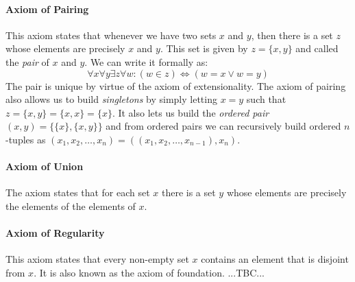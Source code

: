 
\paragraph{Axiom of Pairing}
This axiom states that whenever we have two sets $x$ and $y$, then there is a set $z$ whose elements are precisely $x$ and $y$. This set is given by $z = \{x, y\}$ and called the \emph{pair} of $x$ and $y$. We can write it formally as:
\begin{equation}
\forall x \forall y \exists z \forall w: (w \in z) \Leftrightarrow (w = x \vee w = y)
\end{equation}
The pair is unique by virtue of the axiom of extensionality. The axiom of pairing also allows us to build \emph{singletons} by simply letting $x = y$ such that  $z = \{x, y\} = \{x, x\} = \{x\}$. It also lets us build the \emph{ordered pair} $(x,y) = \{ \{x\}, \{x, y\} \}$ and from ordered pairs we can recursively build ordered $n$-tuples as $(x_1, x_2, \ldots, x_n) = ((x_1, x_2, \ldots, x_{n-1}), x_n)$. 



\paragraph{Axiom of Union}
The axiom states that for each set $x$ there is a set $y$ whose elements are precisely the elements of the elements of $x$.






\paragraph{Axiom of Regularity}
This axiom states that every non-empty set $x$ contains an element that is disjoint from $x$. It is also known as the axiom of foundation. ...TBC...

